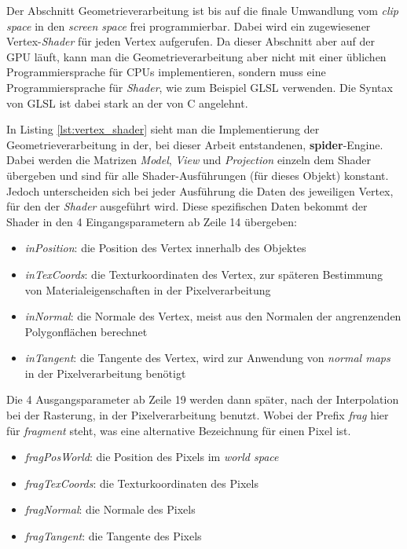 \documentclass[oneside]{ausarbeitung}
\begin{document}
Der Abschnitt Geometrieverarbeitung ist bis auf die finale Umwandlung vom \textit{clip space} in den \textit{screen space} frei programmierbar. Dabei wird ein zugewiesener Vertex-\textit{Shader} für jeden Vertex aufgerufen. Da dieser Abschnitt aber auf der \ac{GPU} läuft, kann man die Geometrieverarbeitung aber nicht mit einer üblichen Programmiersprache für \ac{CPU}s implementieren, sondern muss eine Programmiersprache für \textit{Shader}, wie zum Beispiel GLSL verwenden. Die Syntax von \ac{GLSL} ist dabei stark an der von C angelehnt. 

In Listing \ref{lst:vertex_shader} sieht man die Implementierung der Geometrieverarbeitung in der, bei dieser Arbeit entstandenen, \textbf{spider}-Engine. Dabei werden die Matrizen \textit{Model}, \textit{View} und \textit{Projection} einzeln dem Shader übergeben und sind für alle Shader-Ausführungen (für dieses Objekt) konstant. Jedoch unterscheiden sich bei jeder Ausführung die Daten des jeweiligen Vertex, für den der \textit{Shader }ausgeführt wird. Diese spezifischen Daten bekommt der Shader in den 4 Eingangsparametern ab Zeile 14 übergeben:
\begin{itemize}
\item{\textit{inPosition}: die Position des Vertex innerhalb des Objektes}
\item{\textit{inTexCoords}: die Texturkoordinaten des Vertex, zur späteren Bestimmung von Materialeigenschaften in der Pixelverarbeitung}
\item{\textit{inNormal}: die Normale des Vertex, meist aus den Normalen der angrenzenden Polygonflächen berechnet}
\item{\textit{inTangent}: die Tangente des Vertex, wird zur Anwendung von \textit{normal maps} in der Pixelverarbeitung benötigt}
\end{itemize}

Die 4 Ausgangsparameter ab Zeile 19 werden dann später, nach der Interpolation bei der Rasterung, in der Pixelverarbeitung benutzt. Wobei der Prefix \textit{frag} hier für \textit{fragment} steht, was eine alternative Bezeichnung für einen Pixel ist.
\begin{itemize}
\item{\textit{fragPosWorld}: die Position des Pixels im \textit{world space}}
\item{\textit{fragTexCoords}: die Texturkoordinaten des Pixels}
\item{\textit{fragNormal}: die Normale des Pixels}
\item{\textit{fragTangent}: die Tangente des Pixels}
\end{itemize}
\end{document}
